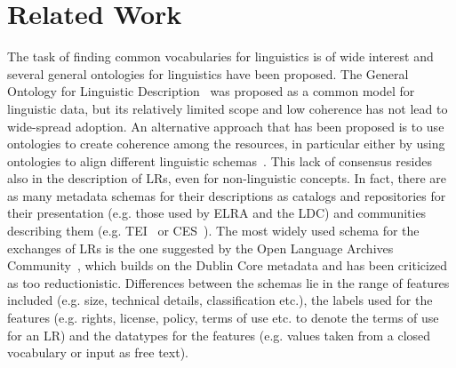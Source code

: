 \documentclass{llncs}
\begin{document}
\section{Related Work}
\label{sec:relatedwork}
The task of finding common vocabularies for linguistics is of wide interest and several general ontologies for linguistics have been proposed. The General Ontology for Linguistic Description~\cite[GOLD]{farrar2002common} was proposed as a common model for linguistic data, but its relatively limited scope and low coherence has not lead to wide-spread adoption. An alternative approach that has been proposed is to use ontologies to create coherence among the resources, in particular either by using ontologies to align different linguistic schemas~\cite{chiarcos2012ontologies}.
This lack of consensus resides also in the description of LRs, even for non-linguistic concepts. In fact, there are as many metadata schemas for their descriptions as
catalogs and repositories for their presentation (e.g. those used by ELRA and
the LDC) and communities describing them (e.g. TEI~\cite{ide1995text} or
CES~\cite{ide1998corpus}). The most widely used schema for the exchanges of LRs is the one  suggested
by the Open Language Archives Community~\cite[OLAC]{bird2001olac}, which builds on
the Dublin Core metadata and has been criticized as too reductionistic.%
Differences between the schemas lie in the range of features included (e.g. size, technical details, classification etc.), the labels used for the features (e.g. rights, license, policy, terms of use etc. to denote the terms of use for an LR) and the datatypes for the features (e.g. values taken from a closed vocabulary or input as free text).
\end{document}
